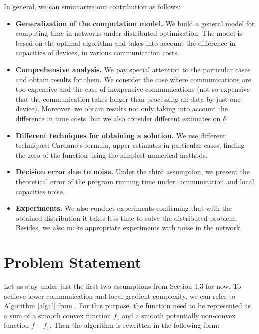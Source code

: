\documentclass{article}
\theoremstyle{definition}
\theoremstyle{plain}
\begin{document}
In general, we can summarize our contribution as follows:
\begin{itemize}
    \item \textbf{Generalization of the computation model.} We build a general model for computing time in networks under distributed optimization. The model is based on the optimal algorithm \cite{kovalev2022optimal} and takes into account the difference in capacities of devices, in various communication costs.
    \item \textbf{Comprehensive analysis.} We pay special attention to the particular cases and obtain results for them. We consider the case where communications are too expensive and the case of inexpensive communications (not so expensive that the communication takes longer than processing all data by just one device). Moreover, we obtain results not only taking into account the  difference in time costs, but we also consider different estimates on $\delta$.
    \item \textbf{Different techniques for obtaining a solution.}  We use different techniques: Cardano's formula, upper estimates in particular cases, finding the zero of the function using the simplest numerical methods.
    \item \textbf{Decision error due to noise.} Under the third assumption, we present the theoretical error of the program running time under communication and local capacities noise.
    \item \textbf{Experiments.} We also conduct experiments confirming that with the obtained distribution it takes less time to solve the distributed problem. Besides, we also make appropriate experiments with noise in the network.
\end{itemize}

\section{Problem Statement}

Let us stay under just the first two assumptions from Section 1.3 for now. To achieve lower communication and local gradient complexity, we can refer to Algorithm \ref{alg:1} from \cite{kovalev2022optimal}. For this purpose, the function need to be represented as a sum of a smooth convex function $f_1$ and a smooth potentially non-convex function $f - f_1$. Then the algorithm is rewritten in the following form:
\end{document}
